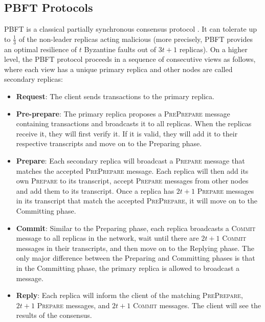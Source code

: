 \documentclass[a4paper,11pt]{article}
\begin{document}
\subsection{PBFT Protocols}\label{sec:pbft}
PBFT is a classical partially synchronous consensus protocol \cite{medium-2019}. It can tolerate up to $\frac13$ of the non-leader replicas acting malicious (more precisely, PBFT provides an optimal resilience of $t$ Byzantine faults out of $3t+1$ replicas). On a higher level, %
the PBFT protocol proceeds in a sequence of consecutive views as follows, where each view has a unique primary replica and other nodes are called secondary replicas: 
\begin{itemize}
    \item \textbf{Request}: The client sends transactions to the primary replica.  
    \item \textbf{Pre-prepare}: The primary replica proposes a \textsc{PrePrepare} message containing transactions and broadcasts it to all replicas. When the replicas receive it, they will first verify it. If it is valid, they will add it to their respective transcripts and move on to the Preparing phase. 
    \item \textbf{Prepare}: Each secondary replica will broadcast a \textsc{Prepare} message that matches the accepted \textsc{PrePrepare} message. Each replica will then add its own \textsc{Prepare} to its transcript, accept \textsc{Prepare} messages from other nodes and add them to its transcript. Once a replica has $2t+1$ \textsc{Prepare} messages in its transcript that match the accepted \textsc{PrePrepare}, it will move on to the Committing phase.
    \item \textbf{Commit}: Similar to the Preparing phase, each replica broadcasts a \textsc{Commit} message to all replicas in the network, wait until there are $2t+1$ \textsc{Commit} messages in their transcripts, and then move on to the Replying phase. The only major difference between the Preparing and Committing phases is that in the Committing phase, the primary replica is allowed to broadcast a message.
    \item \textbf{Reply}: Each replica will inform the client of the matching \textsc{PrePrepare}, $2t+1$ \textsc{Prepare} messages, and $2t+1$ \textsc{Commit} messages. The client will see the results of the consensus. 
\end{itemize}
\end{document}
